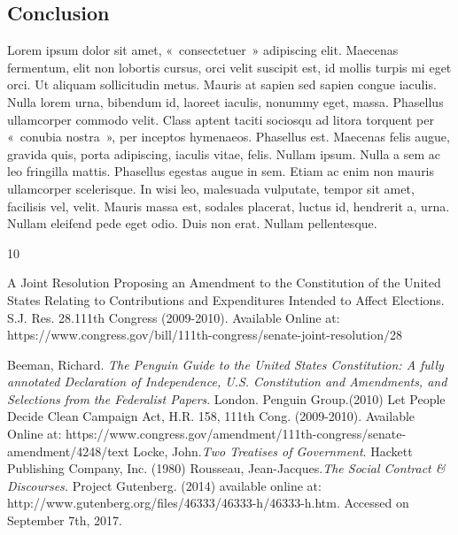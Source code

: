 \documentclass[Master of Arts,synopsis]{iitmdiss}
\begin{document}
\begin{doublespacing}
\section{Conclusion}
\hrulefill


Lorem ipsum dolor sit amet, «~consectetuer~» adipiscing elit. Maecenas fermentum, elit non lobortis cursus, orci velit suscipit est, id mollis turpis mi eget orci. Ut aliquam sollicitudin metus. Mauris at sapien sed sapien congue iaculis. Nulla lorem urna, bibendum id, laoreet iaculis, nonummy eget, massa. Phasellus ullamcorper commodo velit. Class aptent taciti sociosqu ad litora torquent per «~conubia nostra~», per inceptos hymenaeos. Phasellus est. Maecenas felis augue, gravida quis, porta adipiscing, iaculis vitae, felis. Nullam ipsum. Nulla a sem ac leo fringilla mattis. Phasellus egestas augue in sem. Etiam ac enim non mauris ullamcorper scelerisque. In wisi leo, malesuada vulputate, tempor sit amet, facilisis vel, velit. Mauris massa est, sodales placerat, luctus id, hendrerit a, urna. Nullam eleifend pede eget odio. Duis non erat. Nullam pellentesque.
\end{doublespacing}
\newpage

\begin{flushleft}
\begin{onehalfspacing}
\begin{thebibliography}{10}
\hrulefill

\newline
A Joint Resolution Proposing an Amendment to the Constitution of the United States Relating to Contributions and Expenditures Intended to Affect Elections. S.J. Res. 28.111th Congress (2009-2010). Available Online at: https://www.congress.gov/bill/111th-congress/senate-joint-resolution/28
\newline
\linebreak

Beeman, Richard. \textit{The Penguin Guide to the United States Constitution: A fully annotated Declaration of Independence,  U.S. Constitution and Amendments, and Selections from the Federalist Papers}. London. Penguin Group.(2010)
\newline
\linebreak
Let People Decide Clean Campaign Act, H.R. 158, 111th Cong. (2009-2010). Available Online at: https://www.congress.gov/amendment/111th-congress/senate-amendment/4248/text
\newline
\linebreak
Locke, John.\textit{Two Treatises of Government}. Hackett Publishing Company, Inc. (1980)
\newline
\linebreak
Rousseau, Jean-Jacques.\textit{The Social Contract \& Discourses.} Project Gutenberg. (2014) available online at: http://www.gutenberg.org/files/46333/46333-h/46333-h.htm. Accessed on September 7th, 2017.
\newline
\linebreak

\end{thebibliography}
\end{onehalfspacing}
\end{flushleft}
\end{document}
